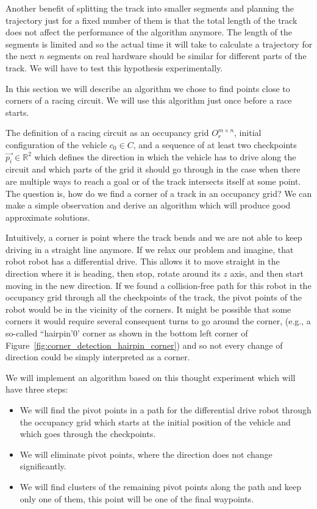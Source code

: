 Another benefit of splitting the track into smaller segments and planning the trajectory just for a fixed number of them is that the total length of the track does not affect the performance of the algorithm anymore. The length of the segments is limited and so the actual time it will take to calculate a trajectory for the next $n$ segments on real hardware should be similar for different parts of the track. We will have to test this hypothesis experimentally.

In this section we will describe an algorithm we chose to find points close to corners of a racing circuit. We will use this algorithm just once before a race starts.

The definition of a racing circuit as an occupancy grid $O_r^{m\times n}$, initial configuration of the vehicle $c_0\in C$, and a sequence of at least two checkpoints $\vec{p_i}\in\mathbb{R}^2$ which defines the direction in which the vehicle has to drive along the circuit and which parts of the grid it should go through in the case when there are multiple ways to reach a goal or of the track intersects itself at some point. The question is, how do we find a corner of a track in an occupancy grid? We can make a simple observation and derive an algorithm which will produce good approximate solutions.

Intuitively, a corner is point where the track bends and we are not able to keep driving in a straight line anymore. If we relax our problem and imagine, that robot robot has a differential drive. This allows it to move straight in the direction where it is heading, then stop, rotate around its $z$ axis, and then start moving in the new direction. If we found a collision-free path for this robot in the occupancy grid through all the checkpoints of the track, the pivot points of the robot would be in the vicinity of the corners. It might be possible that some corners it would require several consequent turns to go around the corner, (e.g., a so-called ``hairpin'0' corner as shown in the bottom left corner of Figure~\ref{fig:corner_detection_hairpin_corner}) and so not every change of direction could be simply interpreted as a corner.

We will implement an algorithm based on this thought experiment which will have three steps:
\begin{itemize}
	\item We will find the pivot points in a path for the differential drive robot through the occupancy grid which starts at the initial position of the vehicle and which goes through the checkpoints.
	\item We will eliminate pivot points, where the direction does not change significantly.
	\item We will find clusters of the remaining pivot points along the path and keep only one of them, this point will be one of the final waypoints.
\end{itemize}

